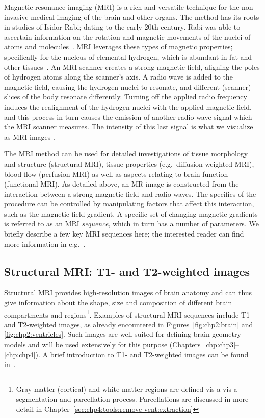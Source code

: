   Magnetic resonance imaging (MRI) is a
rich and versatile technique for the non-invasive medical imaging of
the brain and other organs. The method has its roots in studies of
Isidor Rabi; dating to the early 20th century. Rabi was able to
ascertain information on the rotation and magnetic movements of the
nuclei of atoms and molecules~\cite{thomas2013}. MRI leverages these
types of magnetic properties; specifically for the nucleus of
elemental hydrogen, which is abundant in fat and other
tissues~\cite{berger2002}. An MRI scanner creates a strong magnetic
field, aligning the poles of hydrogen atoms along the scanner's axis.
A radio wave is added to the magnetic field, causing the hydrogen
nuclei to resonate, and different (scanner) slices of the body
resonate differently. Turning off the applied radio frequency induces
the realignment of the hydrogen nuclei with the applied magnetic
field, and this process in turn causes the emission of another radio
wave signal which the MRI scanner measures. The intensity of this last
signal is what we visualize as MRI images \cite{berger2002}.


The MRI method can be used for detailed investigations of tissue
morphology and structure (structural MRI), tissue properties
(e.g.~diffusion-weighted MRI), blood flow (perfusion MRI) as well as
aspects relating to brain function (functional MRI). As detailed
above, an MR image is constructed from the interaction between a
strong magnetic field and radio waves. The specifics of the procedure
can be controlled by manipulating factors that affect this
interaction, such as the magnetic field gradient. A specific set of
changing magnetic gradients is referred to as an MRI \emph{sequence},
which in turn has a number of parameters. We briefly describe a few
key MRI sequences here; the interested reader can find more
information in e.g.~\cite{haacke1999magnetic, payne2017cerebral,
  alexander2007diffusion}.

\subsection{Structural MRI: T1- and T2-weighted images}
\label{sec:T1T2}

Structural MRI provides high-resolution images of brain anatomy and
can thus give information about the shape, size and composition of
different brain compartments and regions\footnote{Gray matter (cortical) and 
white matter regions are defined vis-a-vis a segmentation and 
parcellation process. Parcellations are discussed in more detail in 
Chapter~\ref{sec:chp4:tools:remove-vent:extraction}}. Examples of structural MRI
sequences include T1- and T2-weighted images, as already
encountered in Figures~\ref{fig:chp2:brain} and
\ref{fig:chp2:ventricles}. Such images are well suited for defining
brain geometry models and will be used extensively for this purpose
(Chapters~\ref{chp:chp3}--\ref{chp:chp4}). A brief introduction to T1-
and T2-weighted images can be found in~\cite{pooley2005fundamental}.

